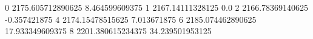 0 2175.605712890625 8.464599609375
1 2167.14111328125 0.0
2 2166.78369140625 -0.357421875
4 2174.15478515625 7.013671875
6 2185.074462890625 17.933349609375
8 2201.380615234375 34.239501953125
